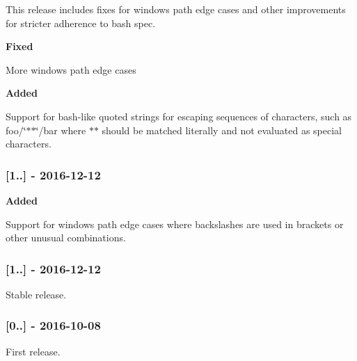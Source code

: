 This release includes fixes for windows path edge cases and other improvements for stricter adherence to bash spec.

{\bfseries Fixed}


\begin{DoxyItemize}
\item More windows path edge cases
\end{DoxyItemize}

{\bfseries Added}


\begin{DoxyItemize}
\item Support for bash-\/like quoted strings for escaping sequences of characters, such as {\ttfamily foo/\char`\"{}$\ast$$\ast$\char`\"{}/bar} where {\ttfamily $\ast$$\ast$} should be matched literally and not evaluated as special characters.
\end{DoxyItemize}

\subsubsection*{\mbox{[}1..\mbox{]} -\/ 2016-\/12-\/12}

{\bfseries Added}


\begin{DoxyItemize}
\item Support for windows path edge cases where backslashes are used in brackets or other unusual combinations.
\end{DoxyItemize}

\subsubsection*{\mbox{[}1..\mbox{]} -\/ 2016-\/12-\/12}

Stable release.

\subsubsection*{\mbox{[}0..\mbox{]} -\/ 2016-\/10-\/08}

First release. 